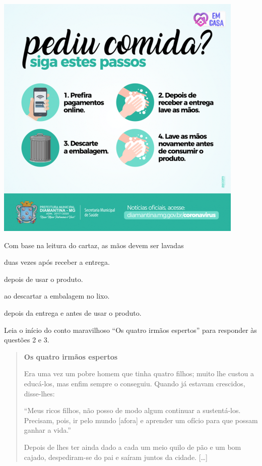 \includegraphics[width=4.68750in,height=4.68750in]{./media/image36.png}

Com base na leitura do cartaz, as mãos devem ser lavadas

\begin{escolha}
\item duas vezes após receber a entrega.

\item depois de usar o produto.

\item ao descartar a embalagem no lixo.

\item depois da entrega e antes de usar o produto.
\end{escolha}



Leia o início do conto maravilhoso ``Os quatro irmãos espertos'' para responder às questões 2 e 3.

\begin{quote}
\textbf{Os quatro irmãos espertos}

Era uma vez um pobre homem que tinha quatro filhos; muito lhe custou a
educá-los, mas enfim sempre o conseguiu. Quando já estavam crescidos,
disse-lhes:

``Meus ricos filhos, não posso de modo algum continuar a sustentá-los.
Precisam, pois, ir pelo mundo [afora] e aprender um ofício para que possam
ganhar a vida.''

Depois de lhes ter ainda dado a cada um meio quilo de pão e um bom
cajado, despediram-se do pai e saíram juntos da cidade. {[}\ldots{}{]}

\end{quote}

